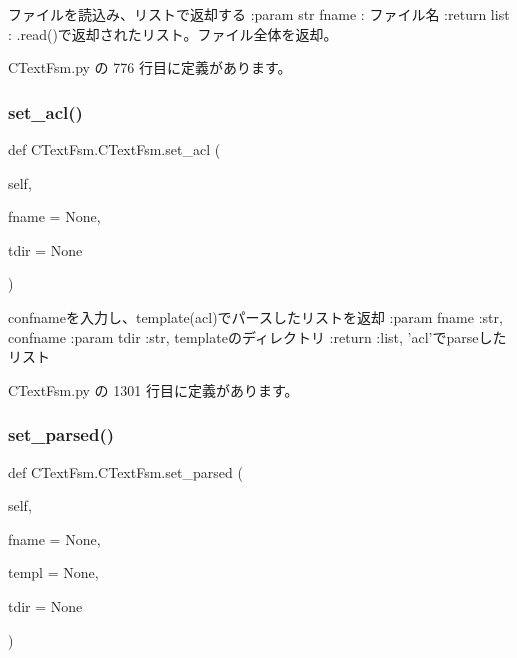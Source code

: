 \begin{DoxyVerb}ファイルを読込み、リストで返却する
:param str fname : ファイル名
:return list     : .read()で返却されたリスト。ファイル全体を返却。
\end{DoxyVerb}
 

 C\+Text\+Fsm.\+py の 776 行目に定義があります。

\mbox{\label{classCTextFsm_1_1CTextFsm_a6e940ba9e9159eef2513342466e2fb11}} 
\subsubsection{\texorpdfstring{set\_acl()}{set\_acl()}}
{\footnotesize\ttfamily def C\+Text\+Fsm.\+C\+Text\+Fsm.\+set\+\_\+acl (\begin{DoxyParamCaption}\item[{}]{self,  }\item[{}]{fname = {\ttfamily None},  }\item[{}]{tdir = {\ttfamily None} }\end{DoxyParamCaption})}

\begin{DoxyVerb}confnameを入力し、template(acl)でパースしたリストを返却
:param  fname :str, confname
:param  tdir  :str, templateのディレクトリ
:return :list, 'acl'でparseしたリスト
\end{DoxyVerb}
 

 C\+Text\+Fsm.\+py の 1301 行目に定義があります。

\mbox{\label{classCTextFsm_1_1CTextFsm_ad5accc7ec3e821ff02e9cdf3f06b1355}} 
\subsubsection{\texorpdfstring{set\_parsed()}{set\_parsed()}}
{\footnotesize\ttfamily def C\+Text\+Fsm.\+C\+Text\+Fsm.\+set\+\_\+parsed (\begin{DoxyParamCaption}\item[{}]{self,  }\item[{}]{fname = {\ttfamily None},  }\item[{}]{templ = {\ttfamily None},  }\item[{}]{tdir = {\ttfamily None} }\end{DoxyParamCaption})}

